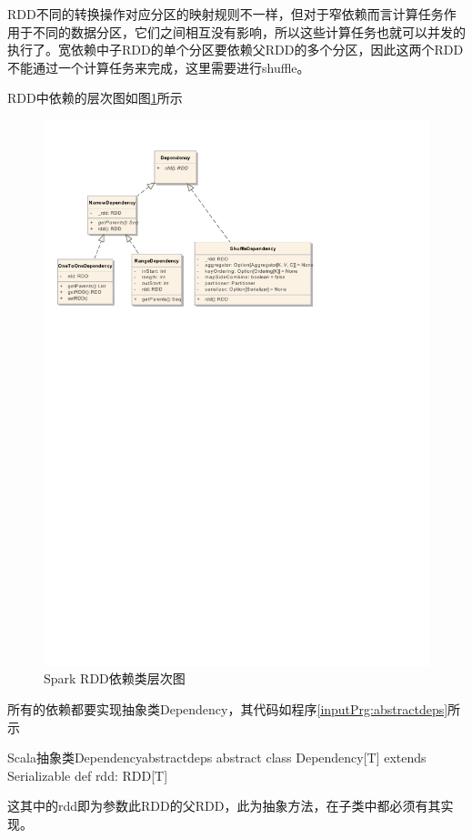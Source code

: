 RDD不同的转换操作对应分区的映射规则不一样，但对于窄依赖而言计算任务作用于不同的数据分区，它们之间相互没有影响，所以这些计算任务也就可以并发的执行了。宽依赖中子RDD的单个分区要依赖父RDD的多个分区，因此这两个RDD不能通过一个计算任务来完成，这里需要进行shuffle。

RDD中依赖的层次图如图\ref{fig:depsclass}所示
\begin{figure}[H] 
	\centering
	\includegraphics[width=\textwidth]{figures/dependencyclassl.pdf}
	\caption{Spark RDD依赖类层次图}
	\label{fig:depsclass}
\end{figure}
所有的依赖都要实现抽象类Dependency，其代码如程序\ref{inputPrg:abstractdeps}所示
\begin{codeInput}{Scala}{抽象类Dependency}{abstractdeps}
abstract class Dependency[T] extends Serializable {
  def rdd: RDD[T]
}
\end{codeInput}
这其中的rdd即为参数此RDD的父RDD，此为抽象方法，在子类中都必须有其实现。

